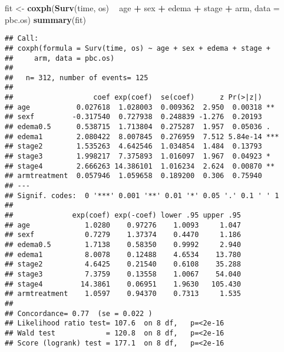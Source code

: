 \documentclass[
  ignorenonframetext,
]{beamer}
\newenvironment{Shaded}{\begin{snugshade}}{\end{snugshade}}
\newcommand{\DataTypeTok}[1]{\textcolor[rgb]{0.13,0.29,0.53}{#1}}
\newcommand{\KeywordTok}[1]{\textcolor[rgb]{0.13,0.29,0.53}{\textbf{#1}}}
\newcommand{\NormalTok}[1]{#1}
\newcommand{\OperatorTok}[1]{\textcolor[rgb]{0.81,0.36,0.00}{\textbf{#1}}}
\newcommand{\StringTok}[1]{\textcolor[rgb]{0.31,0.60,0.02}{#1}}
\begin{document}
\begin{frame}[fragile]{}
\protect\hypertarget{section}{}

\tiny

\begin{Shaded}
\begin{Highlighting}[]
\NormalTok{fit <-}\StringTok{ }\KeywordTok{coxph}\NormalTok{(}\KeywordTok{Surv}\NormalTok{(time, os) }\OperatorTok{~}\StringTok{ }\NormalTok{age }\OperatorTok{+}\StringTok{ }\NormalTok{sex }\OperatorTok{+}\StringTok{ }\NormalTok{edema}
             \OperatorTok{+}\StringTok{ }\NormalTok{stage }\OperatorTok{+}\StringTok{ }\NormalTok{arm, }\DataTypeTok{data =}\NormalTok{ pbc.os)}
\KeywordTok{summary}\NormalTok{(fit)}
\end{Highlighting}
\end{Shaded}

\begin{verbatim}
## Call:
## coxph(formula = Surv(time, os) ~ age + sex + edema + stage + 
##     arm, data = pbc.os)
## 
##   n= 312, number of events= 125 
## 
##                   coef exp(coef)  se(coef)      z Pr(>|z|)    
## age           0.027618  1.028003  0.009362  2.950  0.00318 ** 
## sexf         -0.317540  0.727938  0.248839 -1.276  0.20193    
## edema0.5      0.538715  1.713804  0.275287  1.957  0.05036 .  
## edema1        2.080422  8.007845  0.276959  7.512 5.84e-14 ***
## stage2        1.535263  4.642546  1.034854  1.484  0.13793    
## stage3        1.998217  7.375893  1.016097  1.967  0.04923 *  
## stage4        2.666263 14.386101  1.016234  2.624  0.00870 ** 
## armtreatment  0.057946  1.059658  0.189200  0.306  0.75940    
## ---
## Signif. codes:  0 '***' 0.001 '**' 0.01 '*' 0.05 '.' 0.1 ' ' 1
## 
##              exp(coef) exp(-coef) lower .95 upper .95
## age             1.0280    0.97276    1.0093     1.047
## sexf            0.7279    1.37374    0.4470     1.186
## edema0.5        1.7138    0.58350    0.9992     2.940
## edema1          8.0078    0.12488    4.6534    13.780
## stage2          4.6425    0.21540    0.6108    35.288
## stage3          7.3759    0.13558    1.0067    54.040
## stage4         14.3861    0.06951    1.9630   105.430
## armtreatment    1.0597    0.94370    0.7313     1.535
## 
## Concordance= 0.77  (se = 0.022 )
## Likelihood ratio test= 107.6  on 8 df,   p=<2e-16
## Wald test            = 120.8  on 8 df,   p=<2e-16
## Score (logrank) test = 177.1  on 8 df,   p=<2e-16
\end{verbatim}

\end{frame}
\end{document}
